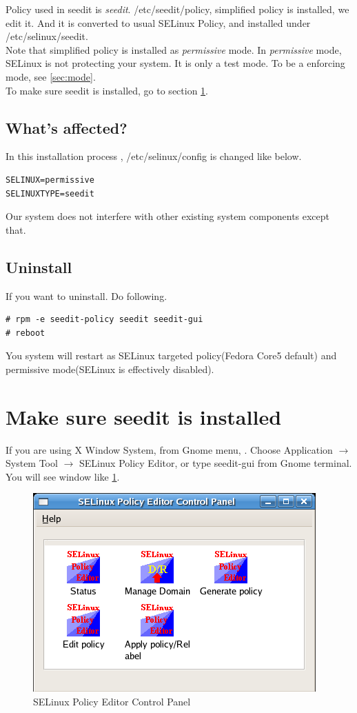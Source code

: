 \documentclass{article}
\begin{document}
Policy used in seedit is {\it seedit}.
/etc/seedit/policy, simplified policy is installed, we edit it.
And it is converted to usual SELinux Policy, and installed under  /etc/selinux/seedit.\\
Note that simplified policy is installed as {\it permissive} mode.
In {\it permissive} mode, SELinux is not protecting your system. It is
 only a test mode. To be a enforcing mode, see \ref{sec:mode}.\\
To make sure seedit is installed, go to section \ref{sec:makesure}.


 \subsection{What's affected?}
 In this installation process ,
/etc/selinux/config is changed like below.
\begin{verbatim}
SELINUX=permissive	
SELINUXTYPE=seedit
\end{verbatim}
Our system does not interfere with other existing system components
except that.
\subsection{Uninstall}
If you want to uninstall. Do following.
\begin{verbatim}
# rpm -e seedit-policy seedit seedit-gui
# reboot
\end{verbatim}
You system will restart as SELinux targeted policy(Fedora Core5 default)
and permissive mode(SELinux is effectively disabled).

\section{Make sure seedit is installed}\label{sec:makesure}

If you are using X Window System,  from  Gnome menu, 
. Choose Application $\rightarrow$ System Tool $\rightarrow$ SELinux
Policy Editor, or type seedit-gui from Gnome terminal.
You will see window like \ref{fig:controlpanel}.


\begin{figure}
\caption{SELinux Policy Editor Control Panel}\label{fig:controlpanel}
\includegraphics*{images/controlpanel.png}
\end{figure}
\end{document}

